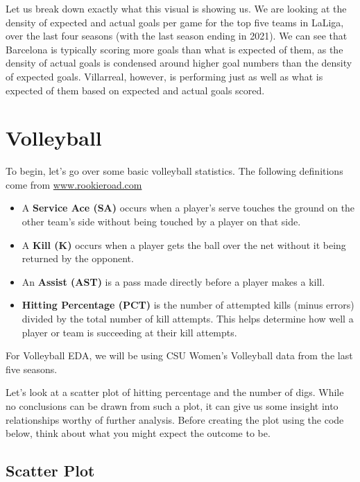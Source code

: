 \documentclass[
  11pt,
]{book}
\providecommand{\tightlist}{%
  \setlength{\itemsep}{0pt}\setlength{\parskip}{0pt}}
\theoremstyle{definition}
\theoremstyle{definition}
\theoremstyle{definition}
\theoremstyle{definition}
\theoremstyle{remark}
\begin{document}
Let us break down exactly what this visual is showing us. We are looking at the density of expected and actual goals per game for the top five teams in LaLiga, over the last four seasons (with the last season ending in 2021). We can see that Barcelona is typically scoring more goals than what is expected of them, as the density of actual goals is condensed around higher goal numbers than the density of expected goals. Villarreal, however, is performing just as well as what is expected of them based on expected and actual goals scored.

\hypertarget{volleyball}{%
\section{Volleyball}\label{volleyball}}

To begin, let's go over some basic volleyball statistics. The following definitions come from \url{www.rookieroad.com}

\begin{itemize}
\tightlist
\item
  A \textbf{Service Ace (SA)} occurs when a player's serve touches the ground on the other team's side without being touched by a player on that side.
\item
  A \textbf{Kill (K)} occurs when a player gets the ball over the net without it being returned by the opponent.
\item
  An \textbf{Assist (AST)} is a pass made directly before a player makes a kill.
\item
  \textbf{Hitting Percentage (PCT)} is the number of attempted kills (minus errors) divided by the total number of kill attempts. This helps determine how well a player or team is succeeding at their kill attempts.
\end{itemize}

For Volleyball EDA, we will be using CSU Women's Volleyball data from the last five seasons.

Let's look at a scatter plot of hitting percentage and the number of digs. While no conclusions can be drawn from such a plot, it can give us some insight into relationships worthy of further analysis. Before creating the plot using the code below, think about what you might expect the outcome to be.

\hypertarget{scatter-plot-1}{%
\subsection{Scatter Plot}\label{scatter-plot-1}}
\end{document}
